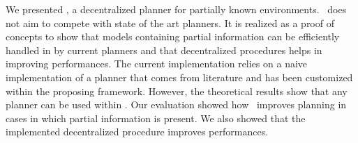 We presented  \toolName, a  decentralized planner for partially known environments.
\toolName\ does not aim to compete with state of the art planners.
It is realized as a proof of concepts to show that models containing partial information can be efficiently handled in by current planners and that decentralized procedures helps in improving performances.
The current implementation relies on a naive implementation of a planner that comes from literature and has been customized within the proposing framework.
However, the theoretical results show that  any planner can be used within \toolName.
Our evaluation showed how  \toolName\ improves planning in cases in which partial information is present.
We also showed that the implemented decentralized procedure improves performances.
